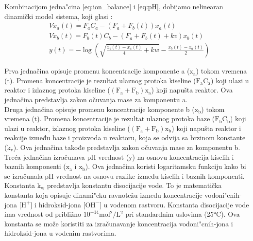 \documentclass[a4paper,11pt]{article}
\theoremstyle{definition} \newtheorem{deff}{Definicija}[section]
\theoremstyle{definition} \newtheorem{prim}[deff]{Primer}
\theoremstyle{plain} \newtheorem{teor}[deff]{Teorema}
\begin{document}
	
	
	Kombinacijom jedna"cina \eqref{eq:ion_balance} i \eqref{eq:pH}, dobijamo nelinearan dinamički model sistema, koji glasi : 
	\begin{equation}\label{eq: model u prostoru}
		\begin{split}
			&V\dot{x}_a(t) = F_aC_a - (F_a + F_b(t))x_a(t) \\
			&V\dot{x}_b(t) = F_b(t)C_b - (F_a + F_b(t) + kv)x_b(t) \\
			&y(t) = -\log\left(\sqrt{\frac{x_b(t) - x_a(t)}{4} + kw} - \frac{x_b(t) - x_a(t)}{2}\right)
		\end{split}
	\end{equation}
	\vspace{0.5cm}
	
	Prva jednačina opisuje promenu koncentracije komponente a ($\mathrm{x_{a}}$) tokom vremena (t). Promena koncentracije je rezultat ulaznog protoka kiseline ($\mathrm{F_{a}C_{a}}$) koji ulazi u reaktor i izlaznog protoka kiseline ($\mathrm{(F_{a}+F_{b})x_{a}}$) koji napušta reaktor. Ova jednačina predstavlja zakon očuvanja mase za komponentu a.\\
	
	Druga jednačina opisuje promenu koncentracije komponente b ($\mathrm{x_{b}}$) tokom vremena (t). Promena koncentracije je rezultat ulaznog protoka baze ($\mathrm{F_{b}C_{b}}$) koji ulazi u reaktor, izlaznog protoka kiseline ($\mathrm{(F_{a}+F_{b})x_{b}}$) koji napušta reaktor i reakcije između baze i proizvoda u reaktoru, koja se odvija sa brzinom konstante ($\mathrm{k_{v}}$). Ova jednačina takođe predstavlja zakon očuvanja mase za komponentu b. \\
	
	Treća jednačina izračunava pH vrednost (y) na osnovu koncentracija kiselih i baznih komponenti ($\mathrm{x_{a}}$ i $\mathrm{x_{b}}$). Ova jednačina koristi logaritamsku funkciju kako bi se izračunala pH vrednost na osnovu razlike između kiselih i baznih komponenti. \\
	
	Konstanta $\mathrm{k_{w}}$ predstavlja konstantu disocijacije vode.  To je matematička konstanta koja opisuje dinami"cku ravnotežu između koncentracije vodoni"cnih-jona [$\text{H}^+$] i hidroksid-jona [$\text{OH}^-$] u vodenom rastvoru. Konstanta disocijacije vode ima vrednost od približno $\mathrm{10^{-14} mol{^2}/L{^2}}$ pri standardnim uslovima (25°C). Ova konstanta se može koristiti za izračunavanje koncentracija vodoni"cnih-jona i hidroksid-jona u vodenim rastvorima. \\
	
\end{document}
